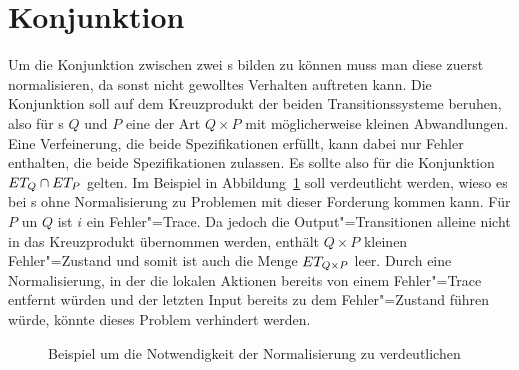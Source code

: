 \section{Konjunktion}

Um die Konjunktion zwischen zwei \MEIO{}s bilden zu können muss man diese
zuerst normalisieren, da sonst nicht gewolltes Verhalten auftreten kann. Die
Konjunktion soll auf dem Kreuzprodukt der beiden Transitionssysteme beruhen,
also für \MEIO{}s $Q$ und $P$ eine \MEIO{} der Art $Q\times P$ mit
möglicherweise kleinen Abwandlungen. Eine Verfeinerung, die beide
Spezifikationen erfüllt, kann dabei nur Fehler enthalten, die beide
Spezifikationen zulassen. Es sollte also für die Konjunktion $ET _Q\cap ET
_P$ gelten. Im Beispiel in Abbildung~\ref{BspKreuzpConj} soll verdeutlicht
werden, wieso es bei \MEIO{}s ohne Normalisierung zu Problemen mit dieser
Forderung kommen kann. Für $P$ un $Q$ ist $i$ ein Fehler"=Trace. Da jedoch die
Output"=Transitionen alleine nicht in das Kreuzprodukt übernommen werden,
enthält $Q\times P$ kleinen Fehler"=Zustand und somit ist auch die Menge $ET
_{Q\times P}$ leer. Durch eine Normalisierung, in der die lokalen Aktionen
bereits von einem Fehler"=Trace entfernt würden und der letzten Input bereits
zu dem Fehler"=Zustand führen würde, könnte dieses Problem verhindert werden.

\begin{figure}[htbp]
  \begin{center}
    \caption{Beispiel um die Notwendigkeit der Normalisierung zu verdeutlichen}
    \label{BspKreuzpConj}
  \end{center}
\end{figure}

